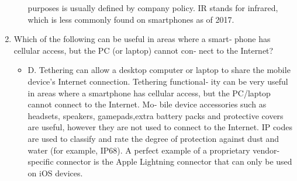 \documentclass{article}
\begin{document}
\begin{enumerate}
\begin{itemize}
purposes is usually defined by company policy. IR stands for
infrared, which is less commonly found on smartphones as of
2017.
    \end{itemize}
    \item Which of the following can be useful in areas where a smart‐
phone has cellular access, but the PC (or laptop) cannot con‐
nect to the Internet?
    \begin{itemize}
        \item D. Tethering can allow a desktop computer or laptop to share
the mobile device’s Internet connection. Tethering functional‐
ity can be very useful in areas where a smartphone has cellular
access, but the PC/laptop cannot connect to the Internet. Mo‐
bile device accessories such as headsets, speakers, gamepads,extra battery packs and protective covers are useful, however
they are not used to connect to the Internet. IP codes are used
to classify and rate the degree of protection against dust and
water (for example, IP68). A perfect example of a proprietary
vendor-specific connector is the Apple Lightning connector
that can only be used on iOS devices.
    \end{itemize}
\end{enumerate}
\end{document}
